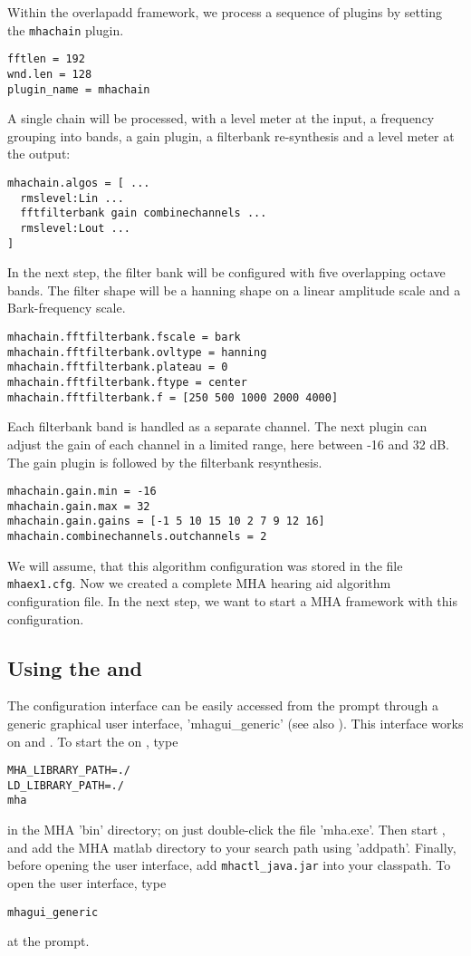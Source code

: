 Within the overlapadd framework, we process a sequence of plugins
by setting the \verb!mhachain! plugin.
\begin{verbatim}
fftlen = 192
wnd.len = 128
plugin_name = mhachain
\end{verbatim}
A single chain will be processed, with a level meter at the input, a
frequency grouping into bands, a gain plugin, a filterbank re-synthesis
and a level meter at the output:
\begin{verbatim}
mhachain.algos = [ ...
  rmslevel:Lin ...
  fftfilterbank gain combinechannels ...
  rmslevel:Lout ...
]
\end{verbatim}
In the next step, the filter bank will be configured with five
overlapping octave bands. The filter shape will be a hanning shape on
a linear amplitude scale and a Bark-frequency scale.
\begin{verbatim}
mhachain.fftfilterbank.fscale = bark
mhachain.fftfilterbank.ovltype = hanning
mhachain.fftfilterbank.plateau = 0
mhachain.fftfilterbank.ftype = center
mhachain.fftfilterbank.f = [250 500 1000 2000 4000]
\end{verbatim}
Each filterbank band is handled as a separate channel. The next plugin
can adjust the gain of each channel in a limited range, here between
-16 and 32 dB. The gain plugin is followed by the filterbank
resynthesis.
\begin{verbatim}
mhachain.gain.min = -16
mhachain.gain.max = 32
mhachain.gain.gains = [-1 5 10 15 10 2 7 9 12 16]
mhachain.combinechannels.outchannels = 2
\end{verbatim}

We will assume, that this algorithm configuration was stored in the
file \verb!mhaex1.cfg!. Now we created a complete MHA hearing aid
algorithm configuration file. In the next step, we want to start a MHA
framework with this configuration.

\subsection{Using the \mhad{} and \Matlab{}}

The \mhad{} configuration interface can be easily accessed from the
\Matlab{} prompt through a generic graphical user interface,
'mhagui\_generic' (see also ).
This interface works on \Linux{} and \Windows{}. To start the \mhad{} on \Linux{}, type
\begin{verbatim}
MHA_LIBRARY_PATH=./
LD_LIBRARY_PATH=./
mha
\end{verbatim}
in the MHA 'bin' directory; on \Windows{} just double-click the file
'mha.exe'. Then start \Matlab{}, and add the MHA matlab directory to
your \Matlab{} search path using 'addpath'. Finally, before opening the user interface, add \verb!mhactl_java.jar! into your \Matlab{} classpath. To open the user interface, type
\begin{verbatim}
mhagui_generic
\end{verbatim}
at the \Matlab{} prompt.


